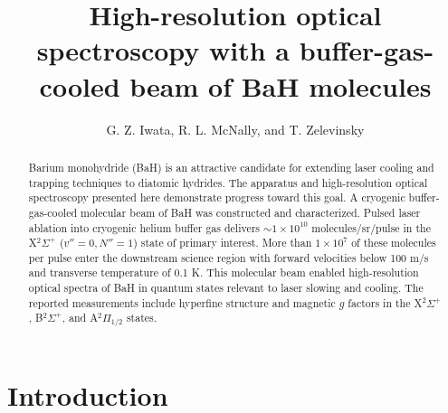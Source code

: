 \documentclass[amsmath,amssymb,aps,twocolumn,longbibliography,notitlepage]{revtex4-1}
\begin{document}
\title{High-resolution optical spectroscopy with a buffer-gas-cooled beam of BaH molecules}





\author{G. Z. Iwata, R. L. McNally, and T. Zelevinsky}

\begin{abstract}
Barium monohydride (BaH) is an attractive candidate for extending laser cooling and trapping techniques to diatomic hydrides.  The apparatus and high-resolution optical spectroscopy presented here demonstrate progress toward this goal.  A cryogenic buffer-gas-cooled molecular beam of BaH was constructed and characterized.  Pulsed laser ablation into cryogenic helium buffer gas delivers $\sim1\times10^{10}$ molecules/sr/pulse in the X$^2\Sigma^+$ ($v''=0,N''=1$) state of primary interest.  More than $1\times10^7$ of these molecules per pulse enter the downstream science region with forward velocities below 100 m/s and transverse temperature of 0.1 K.  This molecular beam enabled high-resolution optical spectra of BaH in quantum states relevant to laser slowing and cooling.  The reported measurements include hyperfine structure and magnetic $g$ factors in the X$^2\Sigma^+$, B$^2\Sigma^+$, and A$^2\Pi_{1/2}$ states.
\end{abstract}

\maketitle

\section{Introduction}
\end{document}

